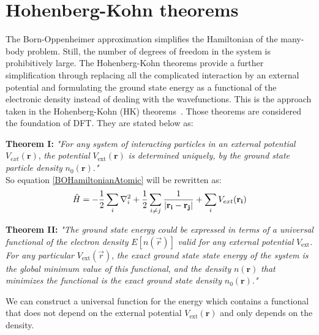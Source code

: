 \section{Hohenberg-Kohn theorems}
\label{HohenbergKohn}
The Born-Oppenheimer approximation simplifies the Hamiltonian of the many-body problem. Still, the number of degrees of freedom in the system is prohibitively large. The Hohenberg-Kohn theorems provide a further simplification through replacing all the complicated interaction by an external potential and formulating the ground state energy as a functional of the electronic density instead of dealing with the wavefunctions. This is the approach taken in the Hohenberg-Kohn (HK) theorems~\cite{Hohenberg1964}. Those theorems are considered the foundation of DFT. They are stated below as:

\textbf{Theorem I:} \textit{"For any system of interacting particles in an external potential} $V_{ext}(\textbf{r})$, \textit{the potential} $V_{\text{ext}}(\textbf{r})$ \textit{is determined uniquely, by the ground state particle density} $n_0(\textbf{r})$.\textit{"} \\
So equation \ref{BOHamiltonianAtomic} will be rewritten as:
\begin{equation}
\hat{H}=
-\frac{1}{2}\sum_{i}{\nabla_i^2} + {1 \over 2} \sum_{i \neq j}{\frac{1}{\left| \mathbf{r_i}-\mathbf{r_j} \right|}} + \sum_{i}{V_{ext}(\mathbf{r_i})}
\label{extpot}
\end{equation}

\textbf{Theorem II:}
\textit{"The ground state energy could be expressed in terms of a universal functional of the electron density} $E[n(\vec{r})]$ \textit{valid for any external potential} $V_{\text{ext}}$. \textit{For any particular} $V_{\text{ext}}(\vec{r})$, \textit{the exact ground state state energy of the system is the global minimum value of this functional, and the density} $n(\textbf{r})$ \textit{that minimizes the functional is the exact ground state density} $n_0(\textbf{r})$.\textit{"} 

We can construct a universal function for the energy which contains a functional that does not depend on the external potential $V_{\text{ext}}(\textbf{r})$ and only depends on the density.
